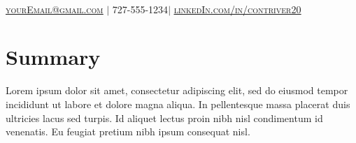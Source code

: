 \documentclass[]{resume-openfont}
\begin{document}
\newcommand{\yourName}{First Last}
\newcommand{\yourWebsite}{contriver20.gitlab.io}
\newcommand{\yourWebsiteLink}{https://contriver20.gitlab.io}
\newcommand{\yourEmail}{yourEmail@gmail.com}
\newcommand{\yourPhone}{727-555-1234}
\newcommand{\githubUserName}{contriver20}
\newcommand{\linkedInUserName}{contriver20}


\begin{center}
    \Huge \scshape \latoRegular{\yourName} \\ \vspace{1pt}
    \small \href{mailto:\yourEmail}{\underline{\yourEmail}}  $|$  \yourPhone $|$ 
    \href{https://www.linkedin.com/in/\linkedInUserName}{\underline{linkedIn.com/in/\linkedInUserName}}
\end{center}

\section{Summary}
Lorem ipsum dolor sit amet, consectetur adipiscing elit, 
sed do eiusmod tempor incididunt ut labore et dolore magna aliqua. 
In pellentesque massa placerat duis ultricies lacus sed turpis. 
Id aliquet lectus proin nibh nisl condimentum id venenatis. 
Eu feugiat pretium nibh ipsum consequat nisl.
\sectionsep
\end{document}
